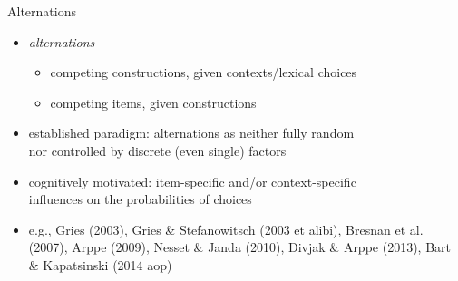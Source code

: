 \begin{frame}
	{Alternations}
	\begin{itemize}
		\item \textit{alternations}
			\begin{itemize}
				\item competing constructions, given contexts\slash lexical choices
				\item competing items, given constructions
			\end{itemize}
		\item established paradigm: alternations as neither fully random\\
			nor controlled by discrete (even single) factors
		\item cognitively motivated: item-specific and\slash or context-specific\\
			influences on the probabilities of choices
		\item e.g., Gries (2003), Gries \& Stefanowitsch (2003 et alibi), Bresnan et al. (2007), Arppe (2009), Nesset \& Janda (2010), Divjak \& Arppe (2013), Bart \& Kapatsinski (2014 aop)
	\end{itemize}
\end{frame}

